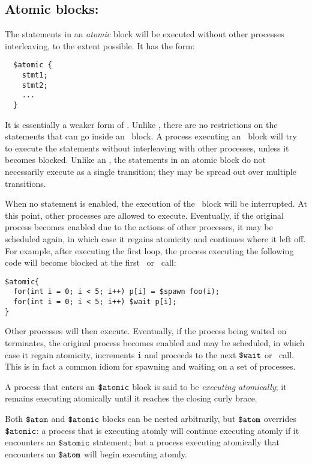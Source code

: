 \subsection{Atomic blocks: \catomic}

The statements in an \emph{atomic} block will be executed without
other processes interleaving, to the extent possible.  It has the
form:
\begin{verbatim}
  $atomic {
    stmt1;
    stmt2;
    ...
  }
\end{verbatim}
It is essentially a weaker form of \catom.  Unlike \catom, there are
no restrictions on the statements that can go inside an \catomic\
block.  A process executing an \catomic~block will try to execute the
statements without interleaving with other processes, unless it
becomes blocked.  Unlike an \catom, the statements in an atomic block
do not necessarily execute as a single transition; they may be spread
out over multiple transitions.

When no statement is enabled, the execution of the \catomic\ block
will be interrupted.  At this point, other processes are allowed to
execute.  Eventually, if the original process becomes enabled due to
the actions of other processes, it may be scheduled again, in which
case it regains atomicity and continues where it left off.  For
example, after executing the first loop, the process executing the
following code will become blocked at the first \cwait\ or \cwaitall\ call:
 \begin{verbatim}  
$atomic{
  for(int i = 0; i < 5; i++) p[i] = $spawn foo(i);
  for(int i = 0; i < 5; i++) $wait p[i];
}
\end{verbatim}
Other processes will then execute. Eventually, if the process being
waited on terminates, the original process becomes enabled and may be
scheduled, in which case it regain atomicity, increments \texttt{i}
and proceeds to the next $\mbox{\texttt{\${}wait}}$ or \cwaitall\ call.  This is in fact a common
idiom for spawning and waiting on a set of processes.

A process that enters an $\mbox{\texttt{\${}atomic}}$ block is said to be
\emph{executing atomically}; it remains executing atomically until it
reaches the closing curly brace.

Both $\mbox{\texttt{\${}atom}}$ and $\mbox{\texttt{\${}atomic}}$ blocks can be nested arbitrarily, but
$\mbox{\texttt{\${}atom}}$ overrides $\mbox{\texttt{\${}atomic}}$: a process that is executing atomly will
continue executing atomly if it encounters an $\mbox{\texttt{\${}atomic}}$ statement;
but a process executing atomically that encounters an $\mbox{\texttt{\${}atom}}$ will
begin executing atomly.

